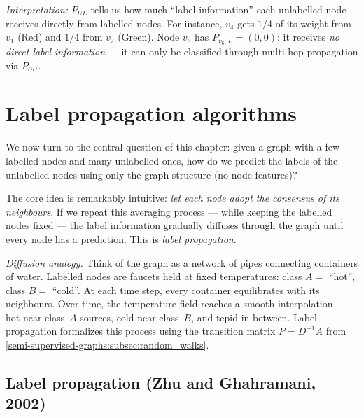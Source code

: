 \begin{notechapter}
\begin{example}
\emph{Interpretation:} $P_{UL}$ tells us how much ``label information'' each
unlabelled node receives directly from labelled nodes. For instance, $v_4$ gets
$1/4$ of its weight from $v_1$ (Red) and $1/4$ from $v_2$ (Green). Node $v_6$
has $P_{v_6, L} = (0, 0)$: it receives \emph{no direct label information} ---
it can only be classified through multi-hop propagation via $P_{UU}$.
\end{example}


\section{Label propagation algorithms}
\label{semi-supervised-graphs:sec:lp}

We now turn to the central question of this chapter: given a graph with a
few labelled nodes and many unlabelled ones, how do we predict the labels of the
unlabelled nodes using only the graph structure (no node features)?

The core idea is remarkably intuitive: \emph{let each node adopt the
consensus of its neighbours}. If we repeat this averaging process --- while
keeping the labelled nodes fixed --- the label information gradually diffuses
through the graph until every node has a prediction. This is
\emph{label propagation}.

\begin{intuition}
\emph{Diffusion analogy.} Think of the graph as a network of pipes
connecting containers of water. Labelled nodes are faucets held at fixed
temperatures: class $A =$ ``hot'', class $B =$ ``cold''. At each time step,
every container equilibrates with its neighbours. Over time, the temperature
field reaches a smooth interpolation --- hot near class~$A$ sources, cold near
class~$B$, and tepid in between. Label propagation formalizes this process
using the transition matrix $P = D^{-1}A$ from
\cref{semi-supervised-graphs:subsec:random_walks}.
\end{intuition}

\subsection{Label propagation (Zhu and Ghahramani, 2002)}
\label{semi-supervised-graphs:subsec:lp_algo}


\end{notechapter}
